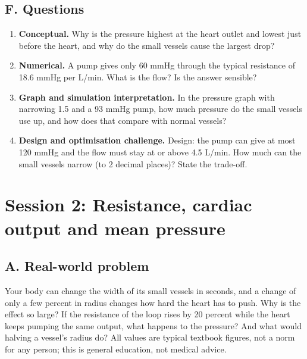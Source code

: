 \documentclass[11pt,a4paper]{article}
\begin{document}
\subsection*{F. Questions}
\begin{enumerate}[nosep]
\item \textbf{Conceptual.} Why is the pressure highest at the heart outlet and lowest just before the heart, and why do the small vessels cause the largest drop?
\item \textbf{Numerical.} A pump gives only 60 mmHg through the typical resistance of 18.6 mmHg per L/min. What is the flow? Is the answer sensible?
\item \textbf{Graph and simulation interpretation.} In the pressure graph with narrowing 1.5 and a 93 mmHg pump, how much pressure do the small vessels use up, and how does that compare with normal vessels?
\item \textbf{Design and optimisation challenge.} Design: the pump can give at most 120 mmHg and the flow must stay at or above 4.5 L/min. How much can the small vessels narrow (to 2 decimal places)? State the trade-off.
\end{enumerate}

\section{Session 2: Resistance, cardiac output and mean pressure}

\subsection*{A. Real-world problem}
Your body can change the width of its small vessels in seconds, and a change of only a few percent in radius changes how hard the heart has to push. Why is the effect so large? If the resistance of the loop rises by 20 percent while the heart keeps pumping the same output, what happens to the pressure? And what would halving a vessel's radius do? All values are typical textbook figures, not a norm for any person; this is general education, not medical advice.
\end{document}
